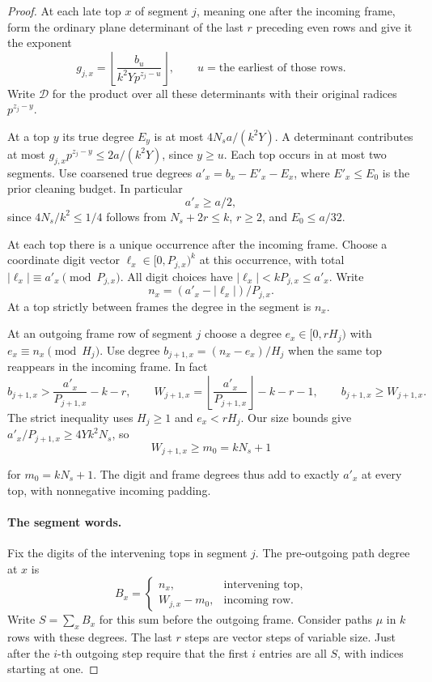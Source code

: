 \begin{proof}
At each late top \(x\) of segment \(j\), meaning one after the
incoming frame, form the ordinary plane determinant of the last
\(r\) preceding even rows and give it the exponent
\[
 g_{j,x}=\left\lfloor\frac{b_u}{k^2Yp^{z_j-u}}\right\rfloor,
 \qquad u=\text{the earliest of those rows}.
\]
Write \(\mathcal D\) for the product over all these determinants
with their original radices \(p^{z_j-y}\).

At a top \(y\) its
true degree \(E_y\) is at most \(4N_s a/(k^2Y)\). A determinant
contributes at most \(g_{j,x}p^{z_j-y}\le 2a/(k^2Y)\), since
\(y\ge u\). Each top occurs in at most two segments. Use coarsened
true degrees \(a'_x=b_x-E'_x-E_x\), where \(E'_x\le E_0\) is the
prior cleaning budget. In particular
\[
 a'_x\ge a/2,
\]
since
\(4N_s/k^2\le 1/4\) follows from \(N_s+2r\le k\),
\(r\ge2\), and \(E_0\le a/32\).

At each top there is a unique occurrence after the incoming
frame. Choose a coordinate digit vector \(\ell_x\in[0,P_{j,x})^k\)
at this occurrence, with total \(|\ell_x|\equiv a'_x\pmod{P_{j,x}}\).
All digit choices have \(|\ell_x|<kP_{j,x}\le a'_x\). Write
\[
 n_x=(a'_x-|\ell_x|)/P_{j,x}.
\]
At a top strictly between frames
the degree in the segment is \(n_x\).

At an outgoing frame row
of segment \(j\) choose a degree \(e_x\in[0,rH_j)\) with
\(e_x\equiv n_x\pmod{H_j}\). Use degree \(b_{j+1,x}=(n_x-e_x)/H_j\)
when the same top reappears in the incoming frame. In fact
\[
 b_{j+1,x}>\frac{a'_x}{P_{j+1,x}}-k-r,
 \qquad
 W_{j+1,x}=\left\lfloor\frac{a'_x}{P_{j+1,x}}\right\rfloor-k-r-1,
 \qquad b_{j+1,x}\ge W_{j+1,x}.
\]
The strict inequality uses \(H_j\ge1\) and \(e_x<rH_j\). Our size
bounds give \(a'_x/P_{j+1,x}\ge4Yk^2N_s\), so
\[
 W_{j+1,x}\ge m_0=kN_s+1
\]

for \(m_0=kN_s+1\). The digit and frame degrees thus add to exactly
\(a'_x\) at every top, with nonnegative incoming padding.

\paragraph{The segment words.}
Fix the digits of the intervening tops in segment \(j\). The pre-outgoing path degree at \(x\) is
\[
 B_x=\begin{cases}n_x,&\text{intervening top},\\ W_{j,x}-m_0,&\text{incoming row}.\end{cases}
\]
Write \(S=\sum_x B_x\)
for this sum before the outgoing frame. Consider paths \(\mu\) in
\(k\) rows with these degrees. The last \(r\) steps are vector
steps of variable size. Just after the \(i\)-th outgoing step
require that the first \(i\) entries are all \(S\), with indices
starting at one.


\end{proof}
